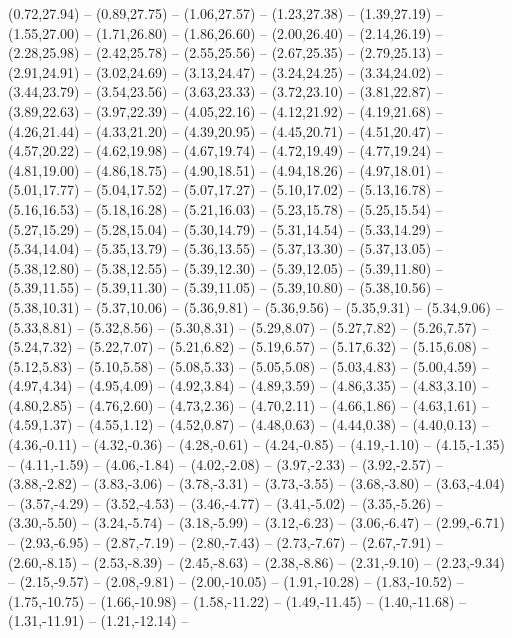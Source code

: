 {  (0.72,27.94) -- (0.89,27.75) -- (1.06,27.57) -- (1.23,27.38) -- (1.39,27.19) -- (1.55,27.00) -- (1.71,26.80) --
  (1.86,26.60) -- (2.00,26.40) -- (2.14,26.19) -- (2.28,25.98) -- (2.42,25.78) -- (2.55,25.56) -- (2.67,25.35) --
  (2.79,25.13) -- (2.91,24.91) -- (3.02,24.69) -- (3.13,24.47) -- (3.24,24.25) -- (3.34,24.02) -- (3.44,23.79) --
  (3.54,23.56) -- (3.63,23.33) -- (3.72,23.10) -- (3.81,22.87) -- (3.89,22.63) -- (3.97,22.39) -- (4.05,22.16) --
  (4.12,21.92) -- (4.19,21.68) -- (4.26,21.44) -- (4.33,21.20) -- (4.39,20.95) -- (4.45,20.71) -- (4.51,20.47) --
  (4.57,20.22) -- (4.62,19.98) -- (4.67,19.74) -- (4.72,19.49) -- (4.77,19.24) -- (4.81,19.00) -- (4.86,18.75) --
  (4.90,18.51) -- (4.94,18.26) -- (4.97,18.01) -- (5.01,17.77) -- (5.04,17.52) -- (5.07,17.27) -- (5.10,17.02) --
  (5.13,16.78) -- (5.16,16.53) -- (5.18,16.28) -- (5.21,16.03) -- (5.23,15.78) -- (5.25,15.54) -- (5.27,15.29) --
  (5.28,15.04) -- (5.30,14.79) -- (5.31,14.54) -- (5.33,14.29) -- (5.34,14.04) -- (5.35,13.79) -- (5.36,13.55) --
  (5.37,13.30) -- (5.37,13.05) -- (5.38,12.80) -- (5.38,12.55) -- (5.39,12.30) -- (5.39,12.05) -- (5.39,11.80) --
  (5.39,11.55) -- (5.39,11.30) -- (5.39,11.05) -- (5.39,10.80) -- (5.38,10.56) -- (5.38,10.31) -- (5.37,10.06) --
  (5.36,9.81) -- (5.36,9.56) -- (5.35,9.31) -- (5.34,9.06) -- (5.33,8.81) -- (5.32,8.56) -- (5.30,8.31) --
  (5.29,8.07) -- (5.27,7.82) -- (5.26,7.57) -- (5.24,7.32) -- (5.22,7.07) -- (5.21,6.82) -- (5.19,6.57) --
  (5.17,6.32) -- (5.15,6.08) -- (5.12,5.83) -- (5.10,5.58) -- (5.08,5.33) -- (5.05,5.08) -- (5.03,4.83) --
  (5.00,4.59) -- (4.97,4.34) -- (4.95,4.09) -- (4.92,3.84) -- (4.89,3.59) -- (4.86,3.35) -- (4.83,3.10) --
  (4.80,2.85) -- (4.76,2.60) -- (4.73,2.36) -- (4.70,2.11) -- (4.66,1.86) -- (4.63,1.61) -- (4.59,1.37) --
  (4.55,1.12) -- (4.52,0.87) -- (4.48,0.63) -- (4.44,0.38) -- (4.40,0.13) -- (4.36,-0.11) -- (4.32,-0.36) --
  (4.28,-0.61) -- (4.24,-0.85) -- (4.19,-1.10) -- (4.15,-1.35) -- (4.11,-1.59) -- (4.06,-1.84) -- (4.02,-2.08) --
  (3.97,-2.33) -- (3.92,-2.57) -- (3.88,-2.82) -- (3.83,-3.06) -- (3.78,-3.31) -- (3.73,-3.55) -- (3.68,-3.80) --
  (3.63,-4.04) -- (3.57,-4.29) -- (3.52,-4.53) -- (3.46,-4.77) -- (3.41,-5.02) -- (3.35,-5.26) -- (3.30,-5.50) --
  (3.24,-5.74) -- (3.18,-5.99) -- (3.12,-6.23) -- (3.06,-6.47) -- (2.99,-6.71) -- (2.93,-6.95) -- (2.87,-7.19) --
  (2.80,-7.43) -- (2.73,-7.67) -- (2.67,-7.91) -- (2.60,-8.15) -- (2.53,-8.39) -- (2.45,-8.63) -- (2.38,-8.86) --
  (2.31,-9.10) -- (2.23,-9.34) -- (2.15,-9.57) -- (2.08,-9.81) -- (2.00,-10.05) -- (1.91,-10.28) -- (1.83,-10.52) --
  (1.75,-10.75) -- (1.66,-10.98) -- (1.58,-11.22) -- (1.49,-11.45) -- (1.40,-11.68) -- (1.31,-11.91) -- (1.21,-12.14) --
}
